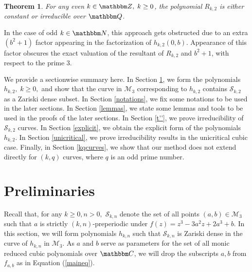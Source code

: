 \documentclass[reqno]{amsart}
\renewcommand{\eqref}[1]{(\ref{#1})}
\numberwithin{equation}{section}
\theoremstyle{plain}
\newtheorem{theorem}{Theorem}[section]
\theoremstyle{definition}
\theoremstyle{definition}
\newcommand{\Q}{{\mathbbm Q}}
\newcommand{\Z}{{\mathbbm Z}}
\newcommand{\C}{{\mathbbm C}}
\newcommand{\N}{{\mathbbm N}}
\begin{document}
    \begin{theorem}
        For any even $k\in \Z,\; k\geq 0$, the polynomial $R_{k,2}$ is either constant or irreducible over $\Q$.
    \end{theorem}
    In the case of odd $k\in \N$, this approach gets obstructed due to an extra $(b^{2}+1)$ factor appearing in the factorization of $h_{k,2}(0,b)$. Appearance of this factor obscures the exact valuation of the resultant of $R_{k,2}$ and $b^{2}+1$, with respect to the prime $3$.
    
    We provide a sectionwise summary here. In Section \ref{prelim}, we form the polynomials $h_{k,2},\; k\geq 0,$ and show that the curve in $\mathcal{M}_{3}$ corresponding to $h_{k,2}$ contains $\mathscr{S}_{k,2}$ as a Zariski dense subset. In Section \ref{notations}, we fix some notations to be used in the later sections. In Section \ref{lemmas}, we state some lemmas and tools to be used in the proofs of the later sections. In Section \ref{t''}, we prove irreducibility of $\mathscr{S}_{k,2}$ curves. In Section \ref{explicit}, we obtain the explicit form of the polynomials $h_{k,2}$. In Section \ref{unicritical}, we prove irreducibility results in the unicritical cubic case. Finally, in Section \ref{kqcurves}, we show that our method does not extend directly for $(k,q)$ curves, where $q$ is an odd prime number. 
    
\section{Preliminaries}\label{prelim}
    Recall that, for any $k\geq 0, n>0,$ $\mathscr{S}_{k,n}$ denote the set of all points $(a,b)\in \mathcal{M}_{3}$ such that $a$ is strictly $(k,n)$-preperiodic under $f(z)= z^{3}-3a^{2}z+2a^{3}+b$. In this section, we will form polynomials $h_{k,n}$ such that $\mathscr{S}_{k,n}$ is Zariski dense in the curve of $h_{k,n}$ in $\mathcal{M}_{3}$. As $a$ and $b$ serve as parameters for the set of all monic reduced cubic polynomials over $\C$, we will drop the subscripts $a,b$ from $f_{a,b}$ as in Equation \eqref{maineq}.
\end{document}
